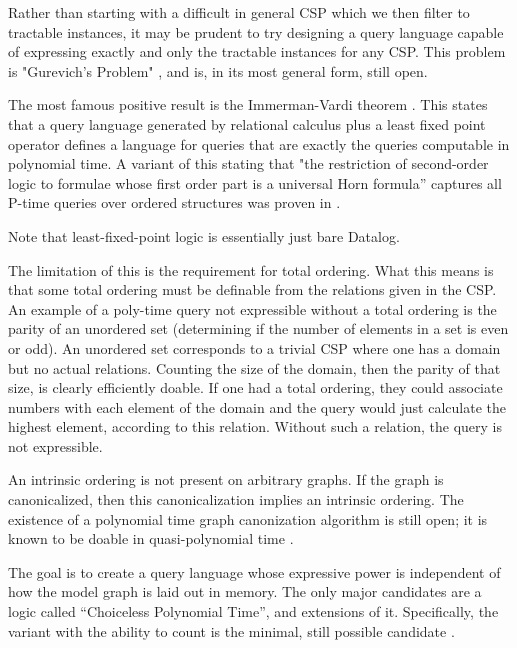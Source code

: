 Rather than starting with a difficult in general CSP which we then filter to tractable instances, it may be prudent to try designing a query language capable of expressing exactly and only the tractable instances for any CSP. This problem is "Gurevich’s Problem" \citep{gurevich1985logic}, and is, in its most general form, still open.

The most famous positive result is the Immerman-Vardi theorem \citep{immerman1982relational}. This states that a query language generated by relational calculus plus a least fixed point operator defines a language for queries that are exactly the queries computable in polynomial time. A variant of this stating that "the restriction of second-order logic to formulae whose first order part is a universal Horn formula” captures all P-time queries over ordered structures was proven in \citep{gradel1991expressive}.

\begin{remark}
Note that least-fixed-point logic is essentially just bare Datalog.
\end{remark}

The limitation of this is the requirement for total ordering. What this means is that some total ordering must be definable from the relations given in the CSP. An example of a poly-time query not expressible without a total ordering is the parity of an unordered set (determining if the number of elements in a set is even or odd). An unordered set corresponds to a trivial CSP where one has a domain but no actual relations. Counting the size of the domain, then the parity of that size, is clearly efficiently doable. If one had a total ordering, they could associate numbers with each element of the domain and the query would just calculate the highest element, according to this relation. Without such a relation, the query is not expressible.

An intrinsic ordering is not present on arbitrary graphs. If the graph is canonicalized, then this canonicalization implies an intrinsic ordering. The existence of a polynomial time graph canonization algorithm is still open; it is known to be doable in quasi-polynomial time \citep{wiebking2021decomposition}.

The goal is to create a query language whose expressive power is independent of how the model graph is laid out in memory. The only major candidates are a logic called “Choiceless Polynomial Time”, and extensions of it. Specifically, the variant with the ability to count is the minimal, still possible candidate \citep{blass1999choiceless}.

